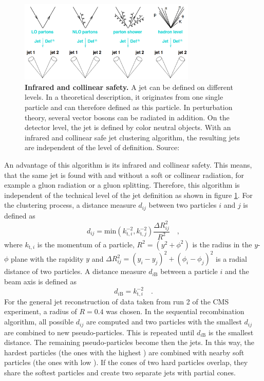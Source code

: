 \begin{figure}
\centering
\includegraphics[width=0.75\textwidth]{chapter_3_gen/IRCsafety.png}
\caption[Infrared and Collinear Safety of Jets]{\textbf{Infrared and collinear safety.} A jet can be defined on different levels. In a theoretical description, it originates from one single particle and can therefore defined as this particle. In perturbation theory, several vector bosons can be radiated in addition. On the detector level, the jet is defined by color neutral objects. With an infrared and collinear safe jet clustering algorithm, the resulting jets are independent of the level of definition. Source: \cite{ICLsafe}}
\label{fig:ch_3_IRCsafety}
\end{figure}

An advantage of this algorithm is its infrared and collinear safety. This means, that the same jet is found with and without a soft or collinear radiation, for example a gluon radiation or a gluon splitting. Therefore, this algorithm is independent of the technical level of the jet definition as shown in figure \ref{fig:ch_3_IRCsafety}. For the clustering process, a distance measure $d_{ij}$ between two particles $i$ and $j$ is defined as
\begin{equation}
d_{ij} = \textrm{min}(k_{\textrm{t},i}^{-2},k_{\textrm{t},j}^{-2})\frac{\Delta R^2_{ij}}{R^2} \quad ,
\end{equation}
where $k_{\textrm{t},i}$ is the momentum of a particle, $R^2 = (y^2 + \phi^2)$ is the radius in the $y$-$\phi$ plane with the rapidity $y$ and $\Delta R^2_{ij} = (y_i - y_j)^2 + (\phi_i - \phi_j)^2$ is a radial distance of two particles. A distance measure $ d_{i\textrm{B}}$ between a particle $i$ and the beam axis is defined as
\begin{equation}
d_{i\textrm{B}} = k^{-2}_{\textrm{t},i} \quad .
\end{equation}
For the general jet reconstruction of data taken from run 2 of the CMS experiment, a radius of $R=0.4$ was chosen. In the sequential recombination algorithm, all possible $d_{ij}$ are computed and two particles with the smallest $d_{ij}$ are combined to new pseudo-particles. This is repeated until $d_{i\textrm{B}}$ is the smallest distance. The remaining pseudo-particles become then the jets. In this way, the hardest particles (the ones with the highest \pt) are combined with nearby soft particles (the ones with low \pt). If the cones of two hard particles overlap, they share the softest particles and create two separate jets with partial cones. 


